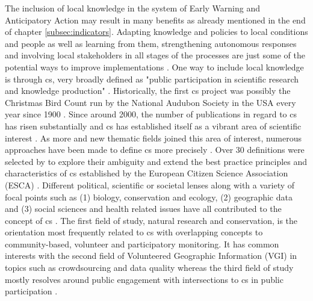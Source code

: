 The inclusion of local knowledge in the system of Early Warning and Anticipatory Action may result in many benefits as already mentioned in the end of chapter \ref{subsec:indicators}. Adapting knowledge and policies to local conditions and people as well as learning from them, strengthening autonomous responses and involving local stakeholders in all stages of the processes are just some of the potential ways to improve implementations \autocite{giordanoIntegrationLocalScientific2013a,idmpDroughtWaterScarcity2022,lackstromBackyardHydroclimatologyCitizen2022,lealfilhoRoleIndigenousKnowledge2022,lealfilhoUnderstandingResponsesClimaterelated2022}. One way to include local knowledge is through \acrfull{cs}, very broadly defined as "public participation in scientific research and knowledge production" \autocite{fraislCitizenScienceEnvironmental2022}.\newline
Historically, the first \acrlong{cs} project was possibly the Christmas Bird Count run by the National Audubon Society in the USA every year since 1900 \autocite{linkHierarchicalModelRegional2006,silvertownNewDawnCitizen2009}. Since around 2000, the number of publications in regard to \acrshort{cs} has risen substantially and \acrshort{cs} has established itself as a vibrant area of scientific interest \autocite{kirschkeCitizenScienceProjects2022}. As more and new thematic fields joined this area of interest, numerous approaches have been made to define \acrshort{cs} more precisely \autocite{haklayWhatCitizenScience2021}.\newline
Over 30 definitions were selected by \autocite{haklayWhatCitizenScience2021} to explore their ambiguity and extend the best practice principles and characteristics of \acrshort{cs} established by the European Citizen Science Association (ESCA) \autocite{escaeuropeancitizenscienceassociationTenPrinciplesCitizen2015,escaECSACharacteristicsCitizen2020}. Different political, scientific or societal lenses along with a variety of focal points such as (1) biology, conservation and ecology, (2) geographic data and (3) social sciences and health related issues have all contributed to the concept of \acrlong{cs} \autocite{haklayWhatCitizenScience2021,kirschkeCitizenScienceProjects2022}. The first field of study, natural research and conservation, is the orientation most frequently related to \acrshort{cs} with overlapping concepts to community-based, volunteer and participatory monitoring. It has common interests with the second field of Volunteered Geographic Information (VGI) in topics such as crowdsourcing and data quality whereas the third field of study mostly resolves around public engagement with intersections to \acrshort{cs} in public participation \autocite{kullenbergWhatCitizenScience2016}.\newline
